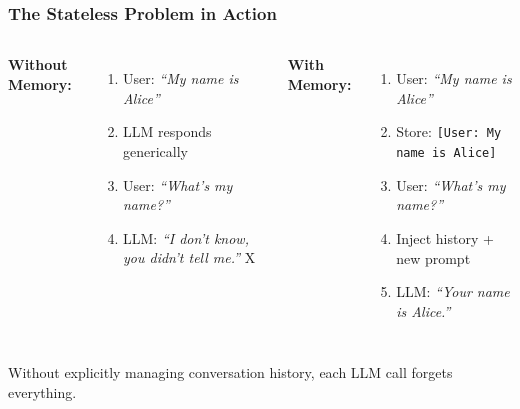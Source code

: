 \documentclass[aspectratio=169,11pt]{beamer}
\begin{document}
\begin{frame}
  \frametitle{The Stateless Problem in Action}
  \begin{columns}
    \textbf{Without Memory:}
    \begin{enumerate}
\setlength{\itemsep}{1pt}
      \item User: \textit{``My name is Alice''}
      \item LLM responds generically
      \item User: \textit{``What's my name?''}
      \item LLM: \textit{``I don't know, you didn't tell me.''} \textcolor{lcred}{X}
    \end{enumerate}

    \textbf{With Memory:}
    \begin{enumerate}
\setlength{\itemsep}{1pt}
      \item User: \textit{``My name is Alice''}
      \item Store: \texttt{[User: My name is Alice]}
      \item User: \textit{``What's my name?''}
      \item Inject history + new prompt
      \item LLM: \textit{``Your name is Alice.''} \textcolor{lcgreen}{\checkmark}
    \end{enumerate}
  \end{columns}
  \vspace{0.8em}
  \begin{warningbox}[Crucial]
    Without explicitly managing conversation history, each LLM call forgets everything.
  \end{warningbox}
\end{frame}
\end{document}
